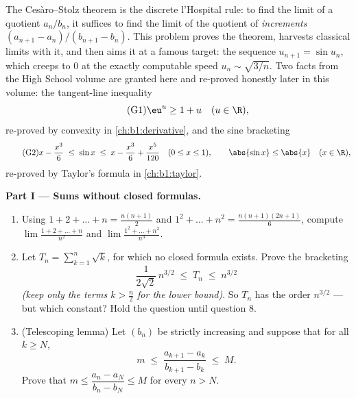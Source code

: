 \begin{problem}[{Weekend problem --- the Ces\`aro--Stolz theorem
and the asymptotics $u_n \sim \sqrt{3/n}$ for $u_{n+1} = \sin
u_n$}]
\label{pb:b1:seq:1}
The Ces\`aro--Stolz theorem is the discrete l'Hospital rule: to
find the limit of a quotient $a_n/b_n$, it suffices to find the
limit of the quotient of \emph{increments} $(a_{n+1} -
a_n)/(b_{n+1} - b_n)$. This problem proves the theorem, harvests
classical limits with it, and then aims it at a famous target:
the sequence $u_{n+1} = \sin u_n$, which creeps to $0$ at the
exactly computable speed $u_n \sim \sqrt{3/n}$. Two facts from the High School
volume are granted here and re-proved honestly later in this
volume: the tangent-line inequality
\[
\tag{G1} \eu^{u} \geq 1 + u \quad (u \in \R),
\]
re-proved by convexity in \cref{ch:b1:derivative}, and the sine
bracketing
\[
\tag{G2} x - \frac{x^3}{6} \;\leq\; \sin x \;\leq\; x -
\frac{x^3}{6} + \frac{x^5}{120} \quad (0 \leq x \leq 1), \qquad
\abs{\sin x} \leq \abs{x} \quad (x \in \R),
\]
re-proved by Taylor's formula in \cref{ch:b1:taylor}.

\medskip
\noindent\textbf{Part I --- Sums without closed formulas.}
\begin{enumerate}
  \item Using $1 + 2 + \dots + n = \frac{n(n+1)}{2}$ and $1^2 +
        \dots + n^2 = \frac{n(n+1)(2n+1)}{6}$, compute
        $\lim \frac{1 + 2 + \dots + n}{n^2}$ and $\lim \frac{1^2 +
        \dots + n^2}{n^3}$.
  \item Let $T_n = \sum_{k=1}^n \sqrt k$, for which no closed
        formula exists. Prove the bracketing
        \[
        \frac{1}{2\sqrt 2}\,n^{3/2} \;\leq\; T_n \;\leq\;
        n^{3/2}
        \]
        \emph{(keep only the terms $k > \frac n2$ for the lower
        bound)}. So $T_n$ has the order $n^{3/2}$ --- but which
        constant? Hold the question until question 8.
  \item (Telescoping lemma) Let $(b_n)$ be strictly increasing
        and suppose that for all $k \geq N$,
        \[
        m \;\leq\; \frac{a_{k+1} - a_k}{b_{k+1} - b_k} \;\leq\;
        M .
        \]
        Prove that $m \leq \dfrac{a_n - a_N}{b_n - b_N} \leq M$
        for every $n > N$.
\end{enumerate}


\end{problem}
